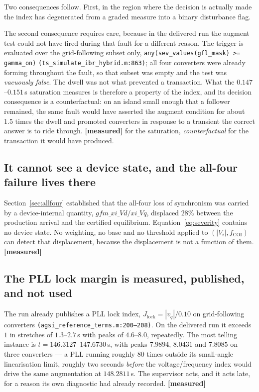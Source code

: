 \documentclass[12pt,a4paper]{article}
\theoremstyle{remark}
\newcommand{\code}[1]{\texttt{\small #1}}
\newcommand{\measured}{\textcolor{ok}{\textbf{[measured]}}}
\begin{document}
Two consequences follow. First, in the region where the decision is actually
made the index has degenerated from a graded measure into a binary disturbance
flag.

The second consequence requires care, because in the delivered run the augment
test could not have fired during that fault for a different reason. The trigger
is evaluated over the grid-following subset only,
\code{any(sev\_values(gfl\_mask) >= gamma\_on)}
\code{(ts\_simulate\_ibr\_hybrid.m:863)}; all four converters were already
forming throughout the fault, so that subset was empty and the test was
\emph{vacuously false}. The dwell was not what prevented a transaction. What the
$0.147$--$0.151$\,s saturation measures is therefore a property of the index, and
its decision consequence is a counterfactual: on an island small enough that a
follower remained, the same fault would have asserted the augment condition for
about $1.5$ times the dwell and promoted converters in response to a transient
the correct answer is to ride through. \measured{} for the saturation,
\emph{counterfactual} for the transaction it would have produced.

\subsection{It cannot see a device state, and the all-four failure lives there}

Section~\ref{sec:allfour} established that the all-four loss of synchronism was
carried by a device-internal quantity,
$gfm\_xi\_Vd/xi\_Vq$, displaced $28\%$ between the production arrival and the
certified equilibrium. Equation~\eqref{eq:severity} contains no device state. No
weighting, no base and no threshold applied to $(|V_i|, f_{\mathrm{COI}})$ can
detect that displacement, because the displacement is not a function of them.
\measured{}

\subsection{The PLL lock margin is measured, published, and not used}

The run already publishes a PLL lock index, $J_{\text{lock}} = |v_q|/0.10$ on
grid-following converters \code{(agsi\_reference\_terms.m:200--208)}. On the
delivered run it exceeds $1$ in stretches of $1.3$--$2.7$\,s with peaks of
$4.6$--$8.0$, repeatedly. The most telling instance is
$t = 146.3127$--$147.6730$\,s, with peaks $7.9894$, $8.0431$ and $7.8085$ on
three converters --- a PLL running roughly $80$ times outside its small-angle
linearisation limit, roughly two seconds \emph{before} the voltage/frequency
index would drive the same augmentation at $148.2811$\,s. The supervisor acts,
and it acts late, for a reason its own diagnostic had already recorded.
\measured{}
\end{document}

